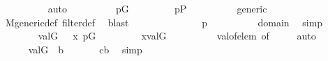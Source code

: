 \begin{isabellebody}
\ \ \ \ \ \ \ \ \isamarkupfalse%
\ auto\isanewline
\ \ \ \ \ \ \isamarkupfalse%
\ \isamarkupfalse%
\ {\isacartoucheopen}p{\isasymin}G{\isacartoucheclose}\ \isanewline
\ \ \ \ \ \ \isamarkupfalse%
\ {\isachardoublequoteopen}p{\isasymin}P{\isachardoublequoteclose}\isanewline
\ \ \ \ \ \ \ \ \isamarkupfalse%
\ generic\ \isamarkupfalse%
\ M{\isacharunderscore}{\kern0pt}generic{\isacharunderscore}{\kern0pt}def\ filter{\isacharunderscore}{\kern0pt}def\ \isamarkupfalse%
\ blast\isanewline
\ \ \ \ \ \ \isamarkupfalse%
\isanewline
\ \ \ \ \ \ \isamarkupfalse%
\ {\isachardoublequoteopen}{\isacharless}{\kern0pt}{\isasymsigma}{\isacharcomma}{\kern0pt}p{\isachargreater}{\kern0pt}{\isasymin}{\isacharquery}{\kern0pt}{\isasymtheta}{\isachardoublequoteclose}\isanewline
\ \ \ \ \ \ \ \ \isamarkupfalse%
\ {\isacartoucheopen}{\isasymsigma}{\isasymin}domain{\isacharparenleft}{\kern0pt}{\isasymtau}{\isacharparenright}{\kern0pt}{\isacartoucheclose}\ \isamarkupfalse%
\ simp\isanewline
\ \ \ \ \ \ \isamarkupfalse%
\ {\isacartoucheopen}val{\isacharparenleft}{\kern0pt}G{\isacharcomma}{\kern0pt}{\isasymsigma}{\isacharparenright}{\kern0pt}\ {\isacharequal}{\kern0pt}\ \ x{\isacartoucheclose}\ {\isacartoucheopen}p{\isasymin}G{\isacartoucheclose}\ \isanewline
\ \ \ \ \ \ \isamarkupfalse%
\ {\isachardoublequoteopen}x{\isasymin}val{\isacharparenleft}{\kern0pt}G{\isacharcomma}{\kern0pt}{\isacharquery}{\kern0pt}{\isasymtheta}{\isacharparenright}{\kern0pt}{\isachardoublequoteclose}\isanewline
\ \ \ \ \ \ \ \ \isamarkupfalse%
\ val{\isacharunderscore}{\kern0pt}of{\isacharunderscore}{\kern0pt}elem\ {\isacharbrackleft}{\kern0pt}of\ {\isacharunderscore}{\kern0pt}\ {\isacharunderscore}{\kern0pt}\ {\isachardoublequoteopen}{\isacharquery}{\kern0pt}{\isasymtheta}{\isachardoublequoteclose}{\isacharbrackright}{\kern0pt}\ \isamarkupfalse%
\ auto\isanewline
\ \ \ \ \isamarkupfalse%
\isanewline
\ \ \ \ \isamarkupfalse%
\ {\isacartoucheopen}val{\isacharparenleft}{\kern0pt}G{\isacharcomma}{\kern0pt}{\isacharquery}{\kern0pt}{\isasymtheta}{\isacharparenright}{\kern0pt}\ {\isasymin}\ {\isacharquery}{\kern0pt}b{\isacartoucheclose}\ \isanewline
\ \ \ \ \isamarkupfalse%
\ {\isachardoublequoteopen}c{\isasymin}{\isacharquery}{\kern0pt}b{\isachardoublequoteclose}\ \isamarkupfalse%
\ simp\isanewline

\end{isabellebody}
